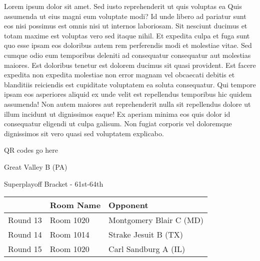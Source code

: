 \documentclass{article}%
\begin{document}
\vspace*{8pt}%
\linebreak%
\newline%
\newline%
Lorem ipsum dolor sit amet. Sed iusto reprehenderit ut quis voluptas ea Quis assumenda ut eius magni eum voluptate modi? Id unde libero ad pariatur sunt eos nisi possimus est omnis nisi ut internos laboriosam. Sit nesciunt ducimus et totam maxime est voluptas vero sed itaque nihil. Et expedita culpa et fuga sunt quo esse ipsam eos doloribus autem rem perferendis modi et molestiae vitae.\newline%
\newline%
Sed cumque odio eum temporibus deleniti ad consequatur consequatur aut molestias maiores. Est doloribus tenetur est dolorem ducimus sit quasi provident. Est facere expedita non expedita molestiae non error magnam vel obcaecati debitis et blanditiis reiciendis est cupiditate voluptatem ea soluta consequatur. Qui tempore ipsam eos asperiores aliquid ex unde velit est repellendus temporibus hic quidem assumenda!\newline%
\newline%
Non autem maiores aut reprehenderit nulla sit repellendus dolore ut illum incidunt ut dignissimos eaque! Ex aperiam minima eos quis dolor id consequatur eligendi ut culpa galisum. Non fugiat corporis vel doloremque dignissimos sit vero quasi sed voluptatem explicabo.\newline%
\newline%
%
\vspace*{30pt}%
\begin{center}%
\begin{Huge}%
QR codes go here%
\end{Huge}%
\end{center}%
\newpage%
\begin{center}%
\begin{Huge}%
Great Valley B (PA)%
\end{Huge}%
\vspace*{8pt}%
\linebreak%
\begin{Large}%
Superplayoff Bracket {-} 61st{-}64th%
\end{Large}%
\end{center}%
%
\begin{tabularx}{\textwidth}{|c|Y|Y|}%
\hline%
&Room Name&Opponent\\%
\hline%
Round 13&Room 1020&Montgomery Blair C (MD)\\%
Round 14&Room 1014&Strake Jesuit B (TX)\\%
Round 15&Room 1020&Carl Sandburg A (IL)\\%
\hline%
\end{tabularx}%
\end{document}
